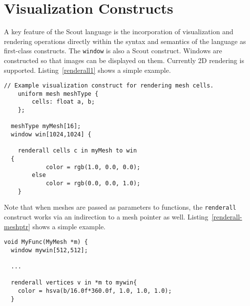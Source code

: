 \let\clearforchapter\par %


\chapter{Visualization Constructs}

A key feature of the Scout language is the incorporation of visualization and
rendering operations directly within the syntax and semantics of the language 
as first-class constructs.  
The \texttt{window} is also a Scout construct.  Windows are constructed so that images can be displayed on them.   Currently 2D rendering is supported.
Listing~\ref{renderall1} shows a simple example.

\par\bigskip
\begin{lstlisting}[float=h,label=renderall1,
	caption={A \texttt{renderall} loop construct.}]
	// Example visualization construct for rendering mesh cells. 
	uniform mesh meshType {
		cells: float a, b;
	};

  meshType myMesh[16];
  window win[1024,1024] {

	renderall cells c in myMesh to win
  {
			color = rgb(1.0, 0.0, 0.0);
		else
			color = rgb(0.0, 0.0, 1.0);
	}
\end{lstlisting}
\par\bigskip\noindent

Note that when meshes are passed as parameters to functions, the \texttt{renderall} construct works via an indirection to a mesh pointer as well.
Listing~\ref{renderall-meshptr} shows a simple example.

\par\bigskip
\begin{lstlisting}[float=h,label=renderall-meshptr,
	caption={A \texttt{renderall} loop construct on mesh parameter.}]
void MyFunc(MyMesh *m) { 
  window mywin[512,512]; 
  
  ...

  renderall vertices v in *m to mywin{
    color = hsva(b/16.0f*360.0f, 1.0, 1.0, 1.0);
  }
\end{lstlisting}
\par\bigskip\noindent




